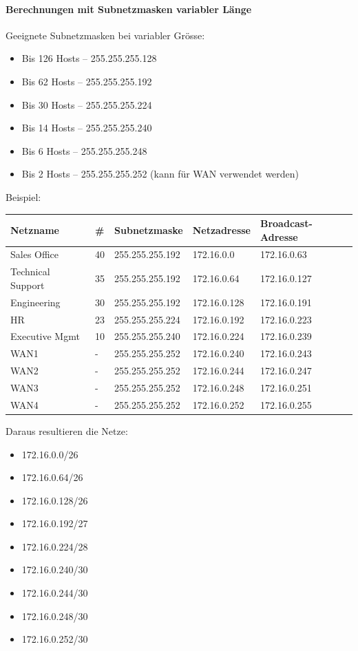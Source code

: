 \documentclass[a4paper,12pt]{article}
\renewcommand{\arraystretch}{1.2}
\begin{document}
\paragraph{Berechnungen mit Subnetzmasken variabler Länge}
Geeignete Subnetzmasken bei variabler Grösse:
\begin{itemize}
\item Bis 126 Hosts -- 255.255.255.128
\item Bis 62 Hosts -- 255.255.255.192
\item Bis 30 Hosts -- 255.255.255.224
\item Bis 14 Hosts -- 255.255.255.240
\item Bis 6 Hosts -- 255.255.255.248
\item Bis 2 Hosts -- 255.255.255.252 (kann für WAN verwendet werden)
\end{itemize}

\setlength{\tabcolsep}{10pt}
\renewcommand{\arraystretch}{1.2}


Beispiel:
\begin{center}
\begin{tabular}{|m{2cm}| m{0.5cm} |m{2.8cm}|m{2cm}|m{2cm}|} 
Netzname & \#  & Subnetzmaske & Netzadresse & Broadcast-Adresse\\
\hline
Sales Office & 40 & 255.255.255.192 & 172.16.0.0 & 172.16.0.63\\
Technical Support & 35 & 255.255.255.192 & 172.16.0.64 & 172.16.0.127\\
Engineering & 30 & 255.255.255.192 & 172.16.0.128 & 172.16.0.191\\
HR & 23 & 255.255.255.224 & 172.16.0.192 & 172.16.0.223\\
Executive Mgmt & 10 & 255.255.255.240 & 172.16.0.224 & 172.16.0.239\\
WAN1 & - & 255.255.255.252 & 172.16.0.240 & 172.16.0.243\\
WAN2 & - & 255.255.255.252 & 172.16.0.244 & 172.16.0.247\\
WAN3 & - & 255.255.255.252 & 172.16.0.248 & 172.16.0.251\\
WAN4 & - & 255.255.255.252 & 172.16.0.252 & 172.16.0.255\\
\end{tabular}
\end{center}

\setlength{\tabcolsep}{18pt}
\renewcommand{\arraystretch}{1.2}

Daraus resultieren die Netze:
\begin{itemize}
\item 172.16.0.0/26
\item 172.16.0.64/26
\item 172.16.0.128/26
\item 172.16.0.192/27
\item 172.16.0.224/28
\item 172.16.0.240/30
\item 172.16.0.244/30
\item 172.16.0.248/30
\item 172.16.0.252/30
\end{itemize}
\end{document}
